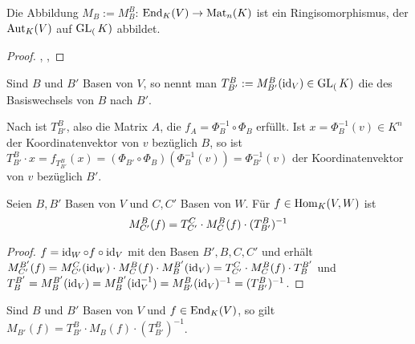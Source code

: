 \begin{conclusion}
	Die Abbildung $M_B:=M_B^B$: $\operatorname{End}_K(V)\to \operatorname{Mat}_n(K)$ ist ein Ringisomorphismus, der $\operatorname{Aut}_K(V)$ auf 
	$\operatorname{GL}_(K)$ abbildet.
\end{conclusion}
\begin{proof}
	, , 
\end{proof}

\begin{definition}[Transformationsmatrix]
	Sind $B$ und $B'$ Basen von $V$, so nennt man $T_{B'}^B:=M_{B'}^B(\operatorname{id}_V)\in 
	\operatorname{GL}_(K)$ die  des Basiswechsels von $B$ nach $B'$.
\end{definition}

\begin{remark}
	Nach  ist $T_{B'}^B$, also die Matrix $A$, die $f_A=\Phi_B^{-1}\circ \Phi_B$ 
	erfüllt. Ist $x=\Phi_B^{-1}(v)\in K^n$ der Koordinatenvektor von $v$ bezüglich $B$, so ist $T_{B'}^B\cdot 
	x=f_{T_{B'}^B}(x)=(\Phi_{B'}\circ \Phi_B)(\Phi_B^{-1}(v))=\Phi_{B'}^{-1}(v)$ der Koordinatenvektor von $v$ 
	bezüglich $B'$.
\end{remark}

\begin{proposition}[Transformationsformel]
	Seien $B,B'$ Basen von $V$ und $C,C'$ Basen von $W$. Für $f\in \operatorname{Hom}_K(V,W)$ ist 
	\begin{align}
		M_{C'}^B(f)=T_{C'}^C\cdot M_C^B(f)\cdot (T_{B'}^B)^{-1}\notag
	\end{align}
\end{proposition}
\begin{proof}
	$f=\operatorname{id}_W\circ f \circ \operatorname{id}_V$ mit den Basen $B',B,C,C'$ und erhält $M_{C'}^{B'}(f)=M_{C'}^C(\operatorname{id}_W)\cdot M_C^B(f)\cdot
	M_B^{B'}(\operatorname{id}_V)=T_{C'}^C\cdot M_C^B(f)\cdot T_B^{B'}$ und $T_B^{B'}=M_B^{B'}(\operatorname{id}_V)=M_B^{B'}(\operatorname{id}_V^{-1})=M_{B'}^B(\operatorname{id}_V)^
	{-1}=(T_{B'}^B)^{-1}$.
\end{proof}

\begin{conclusion}
	Sind $B$ und $B'$ Basen von $V$ und $f\in \operatorname{End}_K(V)$, so gilt $M_{B'}(f)=T_{B'}^B \cdot M_B(f)
	\cdot (T_{B'}^B)^{-1}$.
\end{conclusion}